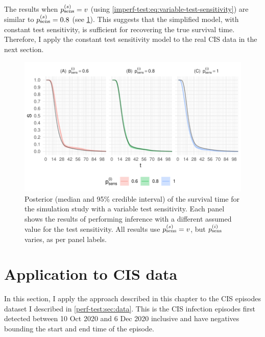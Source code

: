 \documentclass[thesis.tex]{subfiles}
\begin{document}
The results when $p_\text{sens}^{(s)} = v$ (\ie using \cref{imperf-test:eq:variable-test-sensitivity}) are similar to $p_\text{sens}^{(s)} = 0.8$ (see \cref{imperf-test:fig:variable-test-sensitivity}).
This suggests that the simplified model, with constant test sensitivity, is sufficient for recovering the true survival time.
Therefore, I apply the constant test sensitivity model to the real CIS data in the next section.
\begin{figure}
    \includegraphics[width=\textwidth]{cis-imperfect-testing/sim-variable-sensitivity}
  \caption[Simulation study results with varying test sensitivity]{%
    Posterior (median and 95\% credible interval) of the survival time for the simulation study with a variable test sensitivity.
    Each panel shows the results of performing inference with a different assumed value for the test sensitivity.
    All results use $p_\text{sens}^{(s)} = v$, but $p_\text{sens}^{(i)}$ varies, as per panel labels.
  }
  \label{imperf-test:fig:variable-test-sensitivity}
\end{figure}

\section{Application to CIS data} \label{imperf-test:sec:application}

In this section, I apply the approach described in this chapter to the CIS episodes dataset I described in \cref{perf-test:sec:data}.
This is the  CIS infection episodes first detected between 10 Oct 2020 and 6 Dec 2020 inclusive and have negatives bounding the start and end time of the episode.
\end{document}
